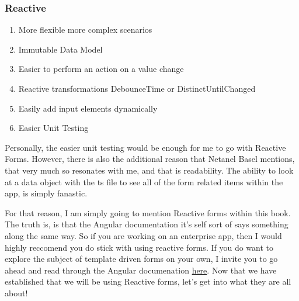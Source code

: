 \subsubsection{ Reactive }
\begin{enumerate}
  \item More flexible \textrightarrow{} more complex scenarios
  \item Immutable Data Model
  \item Easier to perform an action on a value change
  \item Reactive transformations \textrightarrow{} DebounceTime or DistinctUntilChanged
  \item Easily add input elements dynamically
  \item Easier Unit Testing
\end{enumerate}

Personally, the easier unit testing would be enough for me to go with 
Reactive Forms. However, there is also the additional reason that 
Netanel Basel mentions, that very much so resonates with me, and that 
is readability. The ability to look at a data object with the ts  file to see 
all of the form related items within the app, is simply fanastic. 

For that reason, I am simply going to mention Reactive forms within this book. 
The truth is, is that the Angular documentation it's self sort of says 
something along the same way. So if you are working on an enterprise app, then 
I would highly reccomend you do stick with using reactive forms. If you do 
want to explore the subject of template driven forms on your own, I invite you
to go ahead and read through the Angular documenation 
\href{https://angular.io/guide/forms-overview#setup-in-template-driven-forms}{here}. 
Now that we have established that we will be using Reactive forms, let's get into 
what they are all about!

